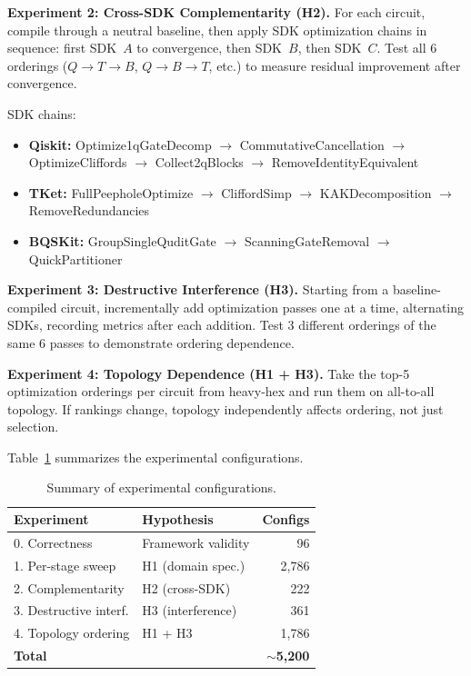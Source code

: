\documentclass[conference]{IEEEtran}
\begin{document}
\textbf{Experiment 2: Cross-SDK Complementarity (H2).}
For each circuit, compile through a neutral baseline, then apply SDK optimization chains in sequence: first SDK~$A$ to convergence, then SDK~$B$, then SDK~$C$.
Test all 6 orderings ($Q \to T \to B$, $Q \to B \to T$, etc.) to measure residual improvement after convergence.

SDK chains:
\begin{itemize}[nosep]
    \item \textbf{Qiskit:} Optimize1qGateDecomp $\to$ CommutativeCancellation $\to$ OptimizeCliffords $\to$ Collect2qBlocks $\to$ RemoveIdentityEquivalent
    \item \textbf{TKet:} FullPeepholeOptimize $\to$ CliffordSimp $\to$ KAKDecomposition $\to$ RemoveRedundancies
    \item \textbf{BQSKit:} GroupSingleQuditGate $\to$ ScanningGateRemoval $\to$ QuickPartitioner
\end{itemize}

\textbf{Experiment 3: Destructive Interference (H3).}
Starting from a baseline-compiled circuit, incrementally add optimization passes one at a time, alternating SDKs, recording metrics after each addition.
Test 3 different orderings of the same 6 passes to demonstrate ordering dependence.

\textbf{Experiment 4: Topology Dependence (H1 + H3).}
Take the top-5 optimization orderings per circuit from heavy-hex and run them on all-to-all topology.
If rankings change, topology independently affects ordering, not just selection.

Table~\ref{tab:expdesign} summarizes the experimental configurations.

\begin{table}[t]
\centering
\caption{Summary of experimental configurations.}
\label{tab:expdesign}
\begin{tabular}{llr}
\toprule
\textbf{Experiment} & \textbf{Hypothesis} & \textbf{Configs} \\
\midrule
0. Correctness         & Framework validity  & 96   \\
1. Per-stage sweep      & H1 (domain spec.)  & 2,786 \\
2. Complementarity      & H2 (cross-SDK)     & 222  \\
3. Destructive interf.  & H3 (interference)  & 361  \\
4. Topology ordering    & H1 + H3            & 1,786 \\
\midrule
\textbf{Total}          &                    & $\sim$\textbf{5,200} \\
\bottomrule
\end{tabular}
\end{table}
\end{document}
